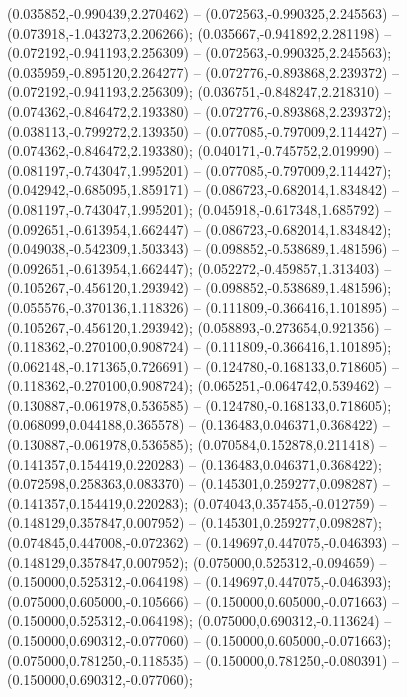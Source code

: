  (0.035852,-0.990439,2.270462) -- (0.072563,-0.990325,2.245563) -- (0.073918,-1.043273,2.206266);
 (0.035667,-0.941892,2.281198) -- (0.072192,-0.941193,2.256309) -- (0.072563,-0.990325,2.245563);
 (0.035959,-0.895120,2.264277) -- (0.072776,-0.893868,2.239372) -- (0.072192,-0.941193,2.256309);
 (0.036751,-0.848247,2.218310) -- (0.074362,-0.846472,2.193380) -- (0.072776,-0.893868,2.239372);
 (0.038113,-0.799272,2.139350) -- (0.077085,-0.797009,2.114427) -- (0.074362,-0.846472,2.193380);
 (0.040171,-0.745752,2.019990) -- (0.081197,-0.743047,1.995201) -- (0.077085,-0.797009,2.114427);
 (0.042942,-0.685095,1.859171) -- (0.086723,-0.682014,1.834842) -- (0.081197,-0.743047,1.995201);
 (0.045918,-0.617348,1.685792) -- (0.092651,-0.613954,1.662447) -- (0.086723,-0.682014,1.834842);
 (0.049038,-0.542309,1.503343) -- (0.098852,-0.538689,1.481596) -- (0.092651,-0.613954,1.662447);
 (0.052272,-0.459857,1.313403) -- (0.105267,-0.456120,1.293942) -- (0.098852,-0.538689,1.481596);
 (0.055576,-0.370136,1.118326) -- (0.111809,-0.366416,1.101895) -- (0.105267,-0.456120,1.293942);
 (0.058893,-0.273654,0.921356) -- (0.118362,-0.270100,0.908724) -- (0.111809,-0.366416,1.101895);
 (0.062148,-0.171365,0.726691) -- (0.124780,-0.168133,0.718605) -- (0.118362,-0.270100,0.908724);
 (0.065251,-0.064742,0.539462) -- (0.130887,-0.061978,0.536585) -- (0.124780,-0.168133,0.718605);
 (0.068099,0.044188,0.365578) -- (0.136483,0.046371,0.368422) -- (0.130887,-0.061978,0.536585);
 (0.070584,0.152878,0.211418) -- (0.141357,0.154419,0.220283) -- (0.136483,0.046371,0.368422);
 (0.072598,0.258363,0.083370) -- (0.145301,0.259277,0.098287) -- (0.141357,0.154419,0.220283);
 (0.074043,0.357455,-0.012759) -- (0.148129,0.357847,0.007952) -- (0.145301,0.259277,0.098287);
 (0.074845,0.447008,-0.072362) -- (0.149697,0.447075,-0.046393) -- (0.148129,0.357847,0.007952);
 (0.075000,0.525312,-0.094659) -- (0.150000,0.525312,-0.064198) -- (0.149697,0.447075,-0.046393);
 (0.075000,0.605000,-0.105666) -- (0.150000,0.605000,-0.071663) -- (0.150000,0.525312,-0.064198);
 (0.075000,0.690312,-0.113624) -- (0.150000,0.690312,-0.077060) -- (0.150000,0.605000,-0.071663);
 (0.075000,0.781250,-0.118535) -- (0.150000,0.781250,-0.080391) -- (0.150000,0.690312,-0.077060);
